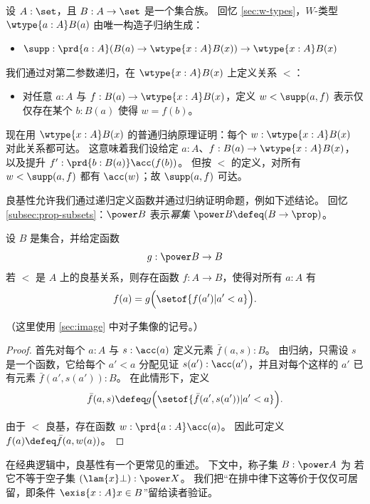 \begin{eg}\label{thm:wtype-wf}
  设 $A:\set$，且 $B : A \to \set$ 是一个集合族。
  回忆 \cref{sec:w-types}，$W$-类型 $\wtype{a:A} B(a)$ 由唯一构造子归纳生成：
  \begin{itemize}
  \item $\supp : \prd{a:A} (B(a) \to \wtype{x:A} B(x)) \to \wtype{x:A} B(x)$
  \end{itemize}
  我们通过对第二参数递归，在 $\wtype{x:A} B(x)$ 上定义关系 $<$：
  \begin{itemize}
  \item 对任意 $a:A$ 与 $f:B(a) \to \wtype{x:A} B(x)$，定义 $w<\supp(a,f)$ 表示仅仅存在某个 $b:B(a)$ 使得 $w = f(b)$。
  \end{itemize}
  现在用 $\wtype{x:A}B(x)$ 的普通归纳原理证明：每个 $w:\wtype{x:A} B(x)$ 对此关系都可达。
  这意味着我们设给定 $a:A$、$f:B(a) \to \wtype{x:A} B(x)$，以及提升 $f' : \prd{b:B(a)} \acc(f(b))$。
  但按 $<$ 的定义，对所有 $w<\supp(a,f)$ 都有 $\acc(w)$；故 $\supp(a,f)$ 可达。
\end{eg}

良基性允许我们通过递归定义函数并通过归纳证明命题，例如下述结论。
回忆 \cref{subsec:prop-subsets}：$\power B$ 表示\emph{幂集} $\power B \defeq (B\to\prop)$。

\begin{lem}\label{thm:wfrec}
  设 $B$ 是集合，并给定函数
  \[ g : \power B \to B \]
  若 $<$ 是 $A$ 上的良基关系，则存在函数 $f:A\to B$，使得对所有 $a:A$ 有
  \begin{equation*}
    f(a) = g\Big(\setof{ f(a') | a'<a }\Big).
  \end{equation*}
\end{lem}
\noindent
（这里使用 \cref{sec:image} 中对子集像的记号。）
\begin{proof}
  首先对每个 $a:A$ 与 $s:\acc(a)$ 定义元素 $\bar f(a,s):B$。
  由归纳，只需设 $s$ 是一个函数，它给每个 $a'<a$ 分配见证 $s(a'):\acc(a')$，并且对每个这样的 $a'$ 已有元素 $\bar f(a',s(a')):B$。
  在此情形下，定义
  \begin{equation*}
    \bar f(a,s) \defeq g\Big(\setof{ \bar f(a',s(a')) | a'<a }\Big).
  \end{equation*}

  由于 $<$ 良基，存在函数 $w:\prd{a:A} \acc(a)$。
  因此可定义 $f(a)\defeq \bar f (a,w(a))$。
\end{proof}

在经典逻辑中，良基性有一个更常见的重述。
下文中，称子集 $B: \power A$ 为
若它不等于空子集 $(\lam{x}\bot) : \power X$。
我们把“在排中律下这等价于仅仅可居留，即条件 $\exis{x:A} x\in B$”留给读者验证。


